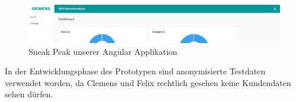 \begin{figure}
    \centering
    \includegraphics[width=1\textwidth]{content/img/Empire/Frontend/Angular_Sneak_Peak.png}
    \caption{Sneak Peak unserer Angular Applikation}
    \label{fig:AngularSneakPeak}
\end{figure}
\FloatBarrier

\faInfoCircle\hspace{2mm}In der Entwicklungsphase des Prototypen sind anonymisierte Testdaten verwendet worden, da Clemens und Felix rechtlich gesehen keine Kundendaten sehen dürfen.




